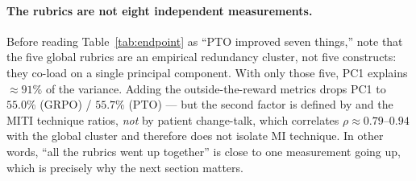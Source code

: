 \paragraph{The rubrics are not eight independent measurements.}
Before reading Table~\ref{tab:endpoint} as ``PTO improved seven things,'' note that the
five global rubrics are an empirical redundancy cluster, not five constructs: they
co-load on a single principal component. With only those five, PC1 explains
${\approx}91\%$ of the variance. Adding the outside-the-reward metrics drops PC1 to
$55.0\%$ (GRPO) / $55.7\%$ (PTO) --- but the second factor is defined by \mici{} and the
MITI technique ratios, \emph{not} by patient change-talk, which correlates
$\rho \approx 0.79$--$0.94$ with the global cluster and therefore does not isolate MI
technique. In other words, ``all the rubrics went up together'' is close to one
measurement going up, which is precisely why the next section matters.
